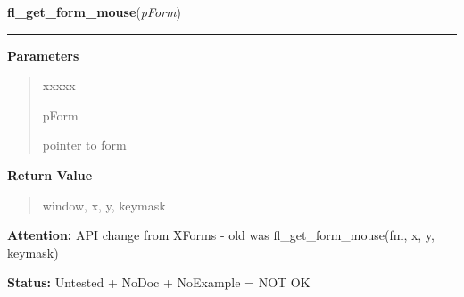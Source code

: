\hspace{.8\funcindent}\begin{boxedminipage}{\funcwidth}

    \raggedright \textbf{fl\_get\_form\_mouse}(\textit{pForm})

    \vspace{-1.5ex}

    \rule{\textwidth}{0.5\fboxrule}
\setlength{\parskip}{2ex}
\setlength{\parskip}{1ex}
      \textbf{Parameters}
      \vspace{-1ex}

      \begin{quote}
        \begin{Ventry}{xxxxx}

          \item[pForm]

          pointer to form

        \end{Ventry}

      \end{quote}

      \textbf{Return Value}
    \vspace{-1ex}

      \begin{quote}
      window, x, y, keymask

      \end{quote}

\textbf{Attention:} API change from XForms - old was fl\_get\_form\_mouse(fm, x, y, keymask)



\textbf{Status:} Untested + NoDoc + NoExample = NOT OK



    \end{boxedminipage}

    \label{xformslib:library:fl_win_to_form}

    \vspace{0.5ex}

